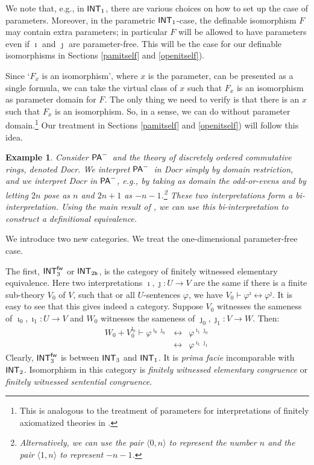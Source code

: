 \documentclass{amsart}
\renewcommand{\iff}{\leftrightarrow}
\renewcommand{\phi}{\varphi}
\newtheorem{exa}[theorem]{Example}
\newcommand{\tupel}[1]{{\langle #1 \rangle}}
\newcommand{\pam}{\ensuremath{{\sf PA}^{-}}}
\begin{document}
We note that, e.g., in ${\sf INT}_1$, 
there are various choices on how to set up the case of parameters. 
Moreover, in the parametric ${\sf INT}_1$-case,  the definable isomorphism
$F$ may contain extra parameters; in particular $F$ will be allowed to have parameters even if $\imath$ 
and $\jmath$ are parameter-free. This will be the case for our definable isomorphisms in 
Sections \ref{pamitself} and \ref{openitself}). 

Since `$F_x$ is an isomorphism', where $x$ is the parameter, can be presented as a single
formula, we can take the virtual class of $x$ such that $F_x$ is an isomorphism as parameter domain for
$F$. The only thing we need to verify is that there is an $x$ such that $F_x$ is an isomorphism.
So, in a sense, we can do without parameter domain.\footnote{This is analogous to the treatment of parameters
for interpretations of finitely axiomatized theories in \cite[p3]{myci:latt90}.} Our treatment 
in Sections \ref{pamitself} and \ref{openitself}) will follow this idea.

\begin{exa}\label{pamsyn}
     Consider \pam\ and the theory of discretely ordered commutative rings, denoted {\sf Docr}.
    We interpret \pam\ in {\sf Docr} simply by domain restriction, and we interpret {\sf Docr} in \pam, e.g., by
taking as domain the odd-or-evens and by
    letting $2n$ pose as $n$ and $2n+1$ as $-n-1$.\footnote{Alternatively, we can use the pair $\tupel{0,n}$ to represent the number $n$ and the pair $\tupel{1,n}$ to represent $-n-1$.}
    These two interpretations form a bi-interpretation.
    Using the main result of \cite{viss:biin25}, we can use this bi-interpretation to construct a
    definitional equivalence.
\end{exa}

We introduce two new categories. We treat the one-dimensional parameter-free case. %

The first, ${\sf INT}_3^{\sf fw}$ or
${\sf INT}_{2{\tt b}}$, is the category of
finitely witnessed elementary equivalence. Here two interpretations $\imath,\jmath:U\to V$
are the same if there is a finite sub-theory $V_0$ of $V$, such that
or all $U$-sentences $\phi$, we have $V_0 \vdash \phi^\imath \iff \phi^\jmath$.
It is easy to see that this gives indeed a category.
Suppose  $V_0$ witnesses the sameness of $\imath_0,\imath_1:U \to V$ and $W_0$ witnesses the
sameness of $\jmath_0,\jmath_1:V \to W$.
Then:
\begin{eqnarray*}
    W_0+ V_0^{\jmath_0} \vdash \phi^{\imath_0\jmath_0} & \iff & \phi^{\imath_1\jmath_0} \\
    & \iff & \phi^{\imath_1\jmath_1}
\end{eqnarray*}
%
Clearly, ${\sf INT}_3^{\sf fw}$ is between ${\sf INT}_3$ and ${\sf INT}_1$. It
is \emph{prima facie} incomparable with ${\sf INT}_2$.
Isomorphism in this category is \emph{finitely witnessed elementary congruence} or \emph{finitely witnessed sentential congruence}.
\end{document}
